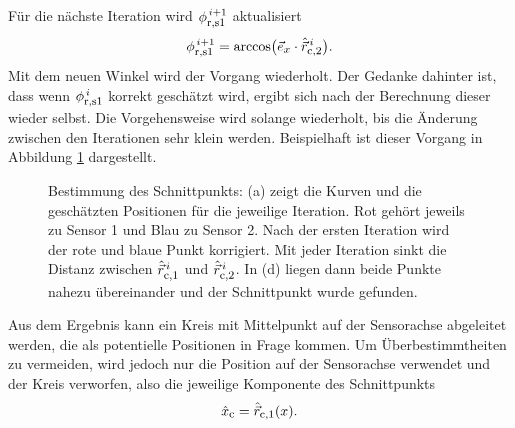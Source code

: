     Für die nächste Iteration wird $\phi_{\textrm{\footnotesize{r,s1}}}^{\,i+1}$ aktualisiert
    \begin{equation}
        \phi_{\textrm{\footnotesize{r,s1}}}^{\,i+1} = \arccos\bigl(\vec{e}_{\textrm{\footnotesize{$x$}}}\cdot\hat{\vec{r}}_{\textrm{\footnotesize{c,2}}}^{\,i}\bigr).
    \end{equation}
    Mit dem neuen Winkel wird der Vorgang wiederholt. Der Gedanke dahinter ist, dass wenn $\phi_{\textrm{\footnotesize{r,s1}}}^{\,i}$ korrekt geschätzt wird, ergibt sich nach der Berechnung dieser wieder selbst. Die Vorgehensweise wird solange wiederholt, bis die Änderung zwischen den Iterationen sehr klein werden. Beispielhaft ist dieser Vorgang in Abbildung \ref{fig:AbslocalIterations} dargestellt.

    \begin{figure}
        \centering
        \label{fig:legend_abslocal}
        \caption{Bestimmung des Schnittpunkts: (a) zeigt die Kurven und die geschätzten Positionen für die jeweilige Iteration. Rot gehört jeweils zu Sensor 1 und Blau zu Sensor 2. Nach der ersten Iteration wird der rote und blaue Punkt korrigiert. Mit jeder Iteration sinkt die Distanz zwischen $\hat{\vec{r}}_{\textrm{\footnotesize{c,1}}}^{\, i}$ und $\hat{\vec{r}}_{\textrm{\footnotesize{c,2}}}^{\, i}$. In (d) liegen dann beide Punkte nahezu übereinander und der Schnittpunkt wurde gefunden.}
        \label{fig:AbslocalIterations}
    \end{figure}

    Aus dem Ergebnis kann ein Kreis mit Mittelpunkt auf der Sensorachse abgeleitet werden, die als potentielle Positionen in Frage kommen. Um Überbestimmtheiten zu vermeiden, wird jedoch nur die Position auf der Sensorachse verwendet und der Kreis verworfen, also die jeweilige Komponente des Schnittpunkts
    \begin{equation}
        \hat{x}_{\textrm{\footnotesize{c}}} = \hat{\vec{r}}_{\textrm{\footnotesize{c,1}}}(x).
    \end{equation} 

